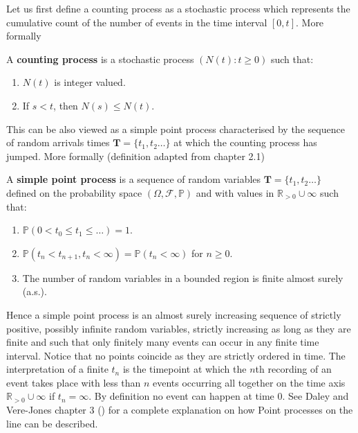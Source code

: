 \documentclass[11pt,a4paper]{article}
\renewcommand{\vec}[1]{\mathbf{#1}}
\begin{document}
Let us first define a counting process as a stochastic process which represents the cumulative count of the number of events in the time interval $[0, t]$. More formally

\begin{definition}
    A \textbf{counting process} is a stochastic process $(N(t) : t \geq 0)$ such that:
    \begin{enumerate}[label=(\roman*)]
        \item $N(t)$ is integer valued.
        \item If $s<t$, then $N(s) \leq N(t)$.
    \end{enumerate}
\end{definition}

This can be also viewed as a simple point process characterised by the sequence of random arrivals times $\vec{T} = \{ t_1, t_2 \dots \}$ at which the counting process has jumped. More formally (definition adapted from \cite{Jacobsen} chapter 2.1)

\begin{definition}
    A \textbf{simple point process} is a sequence of random variables $\vec{T} = \{ t_1, t_2 \dots \}$ defined on the probability space $(\Omega, \mathcal{F}, \mathbb{P})$ and with values in $\mathbb{R}_{>0} \cup \infty$ such that:
    \begin{enumerate}[label=(\roman*)]
        \item $\mathbb{P}(0 < t_0 \leq t_1 \leq \dots) = 1$.
        \item $\mathbb{P}(t_n < t_{n+1}, t_n < \infty) = \mathbb{P}(t_n < \infty)$ for $n \geq 0$.
        \item The number of random variables in a bounded region is finite almost surely (a.s.).
    \end{enumerate}
\end{definition}

Hence a simple point process is an almost surely increasing sequence of strictly positive, possibly infinite random variables, strictly increasing as long as they are finite and such that only finitely many events can occur in any finite time interval. Notice that no points coincide as they are strictly ordered in time.
The interpretation of a finite $t_n$ is the timepoint at which the $n$th recording of an event takes place with less than $n$ events occurring all together on the time axis $\mathbb{R}_{>0} \cup \infty$ if $t_n = \infty$. By definition no event can happen at time $0$. See Daley and Vere-Jones chapter 3 (\cite{Daley}) for a complete explanation on how Point processes on the line can be described.
\end{document}

